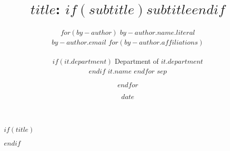 $if(title)$
\title{$title$: $if(subtitle)$$subtitle$$endif$}
$endif$
\author{
	$for(by-author)$%
	$by-author.name.literal$ 
	\\\medskip $by-author.email$%
	$for(by-author.affiliations)$%
	\\\medskip
	\\\medskip
	$if(it.department)$%
	Department of $it.department$
	\\\medskip
	$endif$%
	$it.name$
	$endfor$%
	$sep$ \and $endfor$%
}
\date{$date$}
